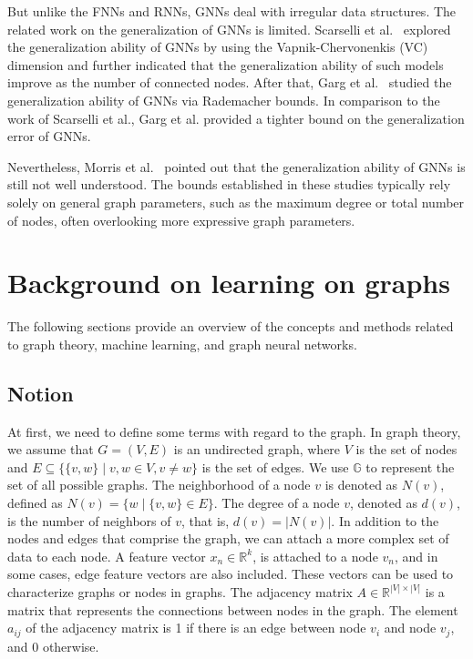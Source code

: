 \documentclass{article}
\begin{document}
But unlike the FNNs and RNNs, GNNs deal with irregular data structures. The related work on the generalization of GNNs is limited. Scarselli et al.~\cite{scarselli2018vapnik} explored the generalization ability of GNNs by using the Vapnik-Chervonenkis (VC) dimension and further indicated that the generalization ability of such models improve as the number of connected nodes. After that, Garg et al.~\cite{garg2020generalization} studied the generalization ability of GNNs via Rademacher bounds. In comparison to the work of Scarselli et al., Garg et al. provided a tighter bound on the generalization error of GNNs.

Nevertheless, Morris et al.~\cite{morris2024futuredirectionstheorygraph} pointed out that the generalization ability of GNNs is still not well understood. The bounds established in these studies typically rely solely on general graph parameters, such as the maximum degree or total number of nodes, often overlooking more expressive graph parameters.


\section{Background on learning on graphs}
The following sections provide an overview of the concepts and methods related to graph theory, machine learning, and graph neural networks. 

\subsection{Notion}
At first, we need to define some terms with regard to the graph. In graph theory, we assume that $G=(V,E)$ is an undirected graph, where $V$ is the set of nodes and $E  \subseteq \{\{v,w\}\mid v,w \in V , v \neq w\}$ is the set of edges. We use $\mathbb{G}$ to represent the set of all possible graphs. The neighborhood of a node $v$ is denoted as $N(v)$, defined as $N(v) = \{w \mid \{v,w\} \in E\}$. The degree of a node $v$, denoted as $d(v)$, is the number of neighbors of $v$, that is, $d(v) = |N(v)|$. In addition to the nodes and edges that comprise the graph, we can attach a more complex set of data to each node.  A feature vector $x_n\in \mathbb{R}^k$, is attached to a node $v_n$, and in some cases, edge feature vectors are also included. These vectors can be used to characterize graphs or nodes in graphs. The adjacency matrix $A \in \mathbb{R}^{|V| \times |V|}$ is a matrix that represents the connections between nodes in the graph. The element $a_{ij}$ of the adjacency matrix is 1 if there is an edge between node $v_i$ and node $v_j$, and 0 otherwise.
\end{document}
